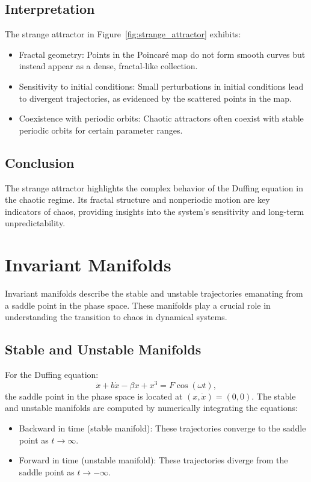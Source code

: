 \documentclass[11pt]{article}
\begin{document}
\subsection*{Interpretation}
The strange attractor in Figure~\ref{fig:strange_attractor} exhibits:
\begin{itemize}
    \item Fractal geometry: Points in the Poincaré map do not form smooth curves but instead appear as a dense, fractal-like collection.
    \item Sensitivity to initial conditions: Small perturbations in initial conditions lead to divergent trajectories, as evidenced by the scattered points in the map.
    \item Coexistence with periodic orbits: Chaotic attractors often coexist with stable periodic orbits for certain parameter ranges.
\end{itemize}

\subsection*{Conclusion}
The strange attractor highlights the complex behavior of the Duffing equation in the chaotic regime. Its fractal structure and nonperiodic motion are key indicators of chaos, providing insights into the system's sensitivity and long-term unpredictability.

\section*{Invariant Manifolds}
Invariant manifolds describe the stable and unstable trajectories emanating from a saddle point in the phase space. These manifolds play a crucial role in understanding the transition to chaos in dynamical systems.

\subsection*{Stable and Unstable Manifolds}
For the Duffing equation:
\[
\ddot{x} + b \dot{x} - \beta x + x^3 = F \cos(\omega t),
\]
the saddle point in the phase space is located at \( (x, \dot{x}) = (0, 0) \). The stable and unstable manifolds are computed by numerically integrating the equations:
\begin{itemize}
    \item Backward in time (stable manifold): These trajectories converge to the saddle point as \(t \to \infty\).
    \item Forward in time (unstable manifold): These trajectories diverge from the saddle point as \(t \to -\infty\).
\end{itemize}
\end{document}
